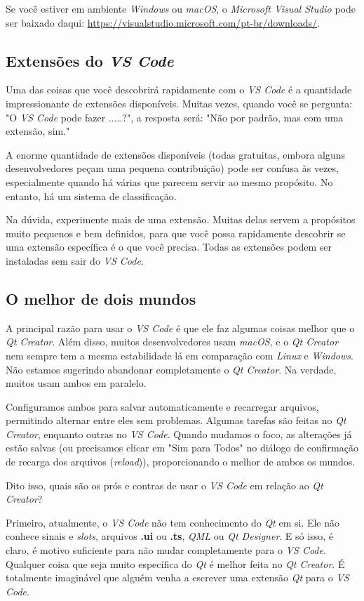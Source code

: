 \documentclass[a4paper,11pt]{article}
\newcommand{\qtcreator}{\textit{Qt Creator}}
\newcommand{\qtdesigner}{\textit{Qt Designer}}
\newcommand{\qt}{\textit{Qt}}
\newcommand{\vscode}{\textit{VS Code}}
\newcommand{\msvs}{\textit{Microsoft Visual Studio}}
\newcommand{\windows}{\textit{Windows}}
\newcommand{\linux}{\textit{Linux}}
\begin{document}
Se você estiver em ambiente \windows{} ou \textit{macOS}, o \msvs{} pode ser baixado daqui: \url{https://visualstudio.microsoft.com/pt-br/downloads/}.
 
\subsection{Extensões do \vscode{}}

Uma das coisas que você descobrirá rapidamente com o \vscode{} é a quantidade impressionante de extensões disponíveis. Muitas vezes, quando você se pergunta: "O \vscode{} pode fazer .....?", a resposta será: "Não por padrão, mas com uma extensão, sim."

A enorme quantidade de extensões disponíveis (todas gratuitas, embora alguns desenvolvedores peçam uma pequena contribuição) pode ser confusa às vezes, especialmente quando há várias que parecem servir ao mesmo propósito. No entanto, há um sistema de classificação.

Na dúvida, experimente mais de uma extensão. Muitas delas servem a propósitos muito pequenos e bem definidos, para que você possa rapidamente descobrir se uma extensão específica é o que você precisa. Todas as extensões podem ser instaladas sem sair do \vscode{}.

\subsection{O melhor de dois mundos}

A principal razão para usar o \vscode{} é que ele faz algumas coisas melhor que o \qtcreator{}. Além disso, muitos desenvolvedores usam \textit{macOS}, e o \qtcreator{} nem sempre tem a mesma estabilidade lá em comparação com \linux{} e \windows{}. Não estamos sugerindo abandonar completamente o \qtcreator{}. Na verdade, muitos usam ambos em paralelo.

Configuramos ambos para salvar automaticamente e recarregar arquivos, permitindo alternar entre eles sem problemas. Algumas tarefas são feitas no \qtcreator{}, enquanto outras no \vscode{}. Quando mudamos o foco, as alterações já estão salvas (ou precisamos clicar em "Sim para Todos" no diálogo de confirmação de recarga dos arquivos (\textit{reload})), proporcionando o melhor de ambos os mundos.

Dito isso, quais são os prós e contras de usar o \vscode{} em relação ao \qtcreator{}?

Primeiro, atualmente, o \vscode{} não tem conhecimento do \qt{} em si. Ele não conhece sinais e \textit{slots}, arquivos \textbf{.ui} ou \textbf{.ts}, \textit{QML} ou \qtdesigner{}. E só isso, é claro, é motivo suficiente para não mudar completamente para o \vscode{}. Qualquer coisa que seja muito específica do \qt{} é melhor feita no \qtcreator{}. É totalmente imaginável que alguém venha a escrever uma extensão \qt{} para o \vscode{}.
\end{document}
